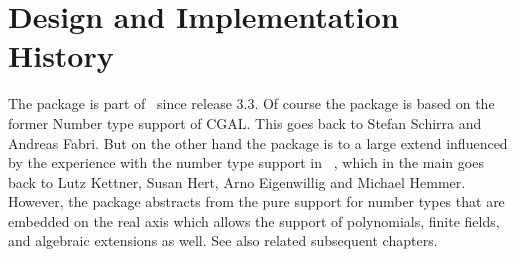 \section{Design and Implementation History}

The package is part of \cgal\ since release 3.3. Of course the package is based 
on the former Number type support of CGAL. This goes back to Stefan Schirra and Andreas Fabri. But on the other hand the package is to a large extend influenced 
by the experience with the number type support in \exacus~\cite{beh+-eeeafcs-05}, 
which in the main goes back to 
Lutz Kettner, Susan Hert, Arno Eigenwillig and Michael Hemmer. 
However, the package abstracts from the pure support for 
number types that are embedded on the real axis which allows the support of 
polynomials, finite fields, and algebraic extensions as well. See also related 
subsequent chapters. 

